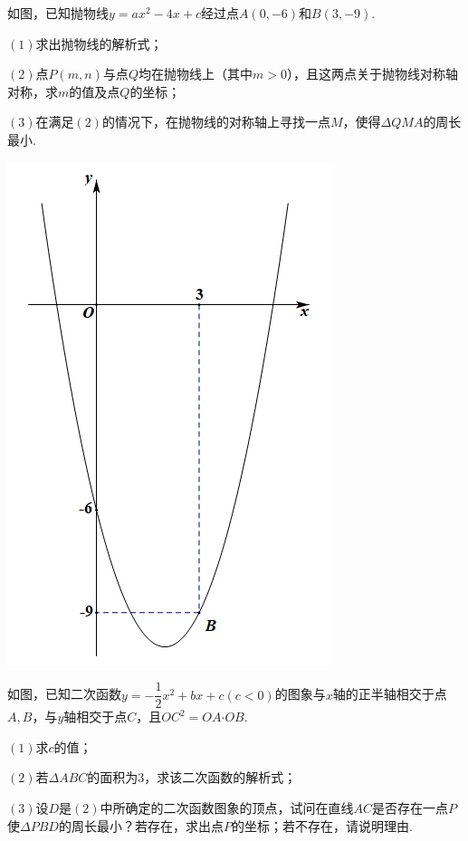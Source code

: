 \documentclass[10pt]{ctexart}
\begin{document}
\begin{dkyi}{}{}
 如图，已知抛物线$y=ax^2-4x+c$经过点$A(0,-6)$和$B(3,-9)$.
 
 $(1)$求出抛物线的解析式；
 
 $(2)$点$P(m,n)$与点$Q$均在抛物线上（其中$m>0$），且这两点关于抛物线对称轴对称，求$m$的值及点$Q$的坐标；
 
 $(3)$在满足$(2)$的情况下，在抛物线的对称轴上寻找一点$M$，使得$\Delta QMA$的周长最小.
\end{dkyi}

\raggedleft
\includegraphics[scale=0.5]{figure/l-27.PNG} 
\begin{jply}{}{}
 如图，已知二次函数$y=-\dfrac{1}{2}x^2+bx+c(c<0)$的图象与$x$轴的正半轴相交于点$A,B$，与$y$轴相交于点$C$，且$OC^2=OA\bm\cdot OB$.
 
 $(1)$求$c$的值；
 
 $(2)$若$\Delta ABC$的面积为$3$，求该二次函数的解析式；
 
 $(3)$设$D$是$(2)$中所确定的二次函数图象的顶点，试问在直线$AC$是否存在一点$P$使$\Delta PBD$的周长最小？若存在，求出点$P$的坐标；若不存在，请说明理由.
\end{jply}
\end{document}
